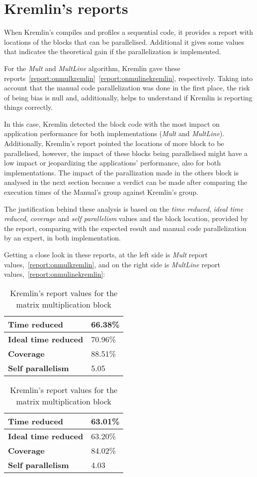 \section{Kremlin's reports}

When Kremlin's compiles and profiles a sequential code, it provides a report with locations of the blocks that can be parallelised. Additional it gives some values that indicates the theoretical gain if the parallelization is implemented.

For the \textit{Mult} and \textit{MultLine} algorithm, Kremlin gave these reports~\ref{report:onmulkremlin}~\ref{report:onmulinekremlin}, respectively. Taking into account that the manual code parallelization was done in the first place, the risk of being bias is null and, additionally, helps to understand if Kremlin is reporting things correctly.

In this case, Kremlin detected the block code with the most impact on application performance for both implementations (\textit{Mult} and \textit{MultLine}). Additionally, Kremlin's report pointed the locations of more block to be parallelised, however, the impact of these blocks being parallelised might have a low impact or jeopardizing the applications' performance, also for both implementations. The impact of the parallization made in the others block is analysed in the next section because a verdict can be made after comparing the execution times of the Manual's group against Kremlin's group. 

The justification behind these analysis is based on the \textit{ time reduced}, \textit{ideal time reduced}, \textit{coverage} and \textit{self parallelism} values and the block location, provided by the report, comparing with the expected result and manual code parallelization by an expert, in both implementation.

Getting a close look in these reports, at the left side is \textit{Mult} report values,~\ref{report:onmulkremlin}, and on the right side is \textit{MultLine} report values,~\ref{report:onmulinekremlin}:

\begin{table}[htb]
\centering
\caption{Kremlin's report values for the matrix multiplication block}
\begin{tabular}{ |l|l| }
	\hline
	\textbf{Time reduced} & 66.38\% \\ \hline
	\textbf{Ideal time reduced} & 70.96\% \\ \hline
	\textbf{Coverage} & 88.51\% \\ \hline
	\textbf{Self parallelism} & 5.05 \\
	\hline
\end{tabular}
\quad
\begin{tabular}{ |l|l| }
	\hline
	\textbf{Time reduced} & 63.01\% \\ \hline
	\textbf{Ideal time reduced} & 63.20\% \\ \hline
	\textbf{Coverage} & 84.02\% \\ \hline
	\textbf{Self parallelism} & 4.03 \\
	\hline
\end{tabular}
\end{table}

